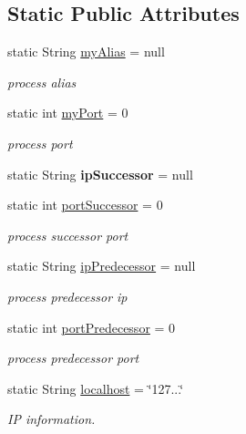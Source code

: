 \subsection*{Static Public Attributes}
\begin{DoxyCompactItemize}
\item 
\mbox{\label{class_chat_a35d411ee8dc3a5b258f9196b45ac4cc9}} 
static String \hyperlink{class_chat_a35d411ee8dc3a5b258f9196b45ac4cc9}{my\+Alias} = null
\begin{DoxyCompactList}\small\item\em process alias \end{DoxyCompactList}\item 
\mbox{\label{class_chat_adf3015afad6879dd1b21a181ce21b16b}} 
static int \hyperlink{class_chat_adf3015afad6879dd1b21a181ce21b16b}{my\+Port} = 0
\begin{DoxyCompactList}\small\item\em process port \end{DoxyCompactList}\item 
\mbox{\label{class_chat_a8b33daf1786a8b71519682464d62044c}} 
static String {\bfseries ip\+Successor} = null
\item 
\mbox{\label{class_chat_a318592ab88caa043fa38ae3a5b2222ad}} 
static int \hyperlink{class_chat_a318592ab88caa043fa38ae3a5b2222ad}{port\+Successor} = 0
\begin{DoxyCompactList}\small\item\em process successor port \end{DoxyCompactList}\item 
\mbox{\label{class_chat_a29acd3e9137ba1a1ea56682229e9271e}} 
static String \hyperlink{class_chat_a29acd3e9137ba1a1ea56682229e9271e}{ip\+Predecessor} = null
\begin{DoxyCompactList}\small\item\em process predecessor ip \end{DoxyCompactList}\item 
\mbox{\label{class_chat_a171c1e8e84a991d86eea4603ec2242d6}} 
static int \hyperlink{class_chat_a171c1e8e84a991d86eea4603ec2242d6}{port\+Predecessor} = 0
\begin{DoxyCompactList}\small\item\em process predecessor port \end{DoxyCompactList}\item 
\mbox{\label{class_chat_aef192c9fcd2a24c9a684f1110afd7de4}} 
static String \hyperlink{class_chat_aef192c9fcd2a24c9a684f1110afd7de4}{localhost} = \char`\"{}127...\char`\"{}
\begin{DoxyCompactList}\small\item\em IP information. \end{DoxyCompactList}\end{DoxyCompactItemize}
